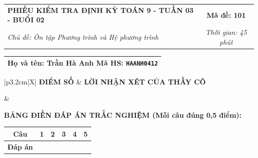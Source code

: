 \documentclass[12pt,a4paper]{article}
\begin{document}
\pagestyle{empty}



\noindent
\begin{tabularx}{\linewidth}{|X|c|}
\hline
\textbf{PHIẾU KIỂM TRA ĐỊNH KỲ TOÁN 9 - TUẦN 03 - BUỔI 02} & \textbf{Mã đề: 101} \\
\textit{Chủ đề: Ôn tập Phương trình và Hệ phương trình} & \textit{Thời gian: 45 phút} \\
\hline
\end{tabularx}

\vspace{1mm}

\noindent
\begin{tabularx}{\linewidth}{|X|}
\hline
\rule[-2mm]{0pt}{7.5mm}\textbf{Họ và tên:} \textbf{\large Trần Hà Anh} \hfill \textbf{Mã HS:} \texttt{HAANH0412} \quad \\
\hline
\end{tabularx}

\vspace{1mm}

\noindent
\begin{tabularx}{\linewidth}{|p{3.2cm}|X|}
\hline
\centering\textbf{ĐIỂM SỐ} & \centering\textbf{LỜI NHẬN XÉT CỦA THẦY CÔ} \tabularnewline
\hline
\rule{0pt}{1.3cm} & \tabularnewline
\hline
\end{tabularx}

\vspace{1.2mm}

\noindent\textbf{BẢNG ĐIỀN ĐÁP ÁN TRẮC NGHIỆM (Mỗi câu đúng 0,5 điểm):}
\vspace{0.8mm}

\noindent
\renewcommand{\arraystretch}{1.35}
\begin{tabularx}{\linewidth}{|c|*{5}{>{\centering\arraybackslash}X|}}
\hline
\textbf{Câu} & \textbf{1} & \textbf{2} & \textbf{3} & \textbf{4} & \textbf{5} \\
\hline
\textbf{Đáp án} & & & & & \\
\hline
\end{tabularx}
\renewcommand{\arraystretch}{1.0}

\vspace{1.5mm}
\end{document}
